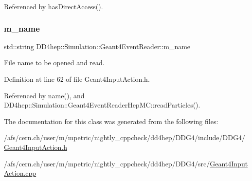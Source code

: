 Referenced by has\+Direct\+Access().

\hypertarget{class_d_d4hep_1_1_simulation_1_1_geant4_event_reader_a0a6ea787174ce598d22ce1616c1f25af}{}\label{class_d_d4hep_1_1_simulation_1_1_geant4_event_reader_a0a6ea787174ce598d22ce1616c1f25af} 
\subsubsection{\texorpdfstring{m\+\_\+name}{m\_name}}
{\footnotesize\ttfamily std\+::string D\+D4hep\+::\+Simulation\+::\+Geant4\+Event\+Reader\+::m\+\_\+name\hspace{0.3cm}{\ttfamily [protected]}}



File name to be opened and read. 



Definition at line 62 of file Geant4\+Input\+Action.\+h.



Referenced by name(), and D\+D4hep\+::\+Simulation\+::\+Geant4\+Event\+Reader\+Hep\+M\+C\+::read\+Particles().



The documentation for this class was generated from the following files\+:\begin{DoxyCompactItemize}
\item 
/afs/cern.\+ch/user/m/mpetric/nightly\+\_\+cppcheck/dd4hep/\+D\+D\+G4/include/\+D\+D\+G4/\hyperlink{_geant4_input_action_8h}{Geant4\+Input\+Action.\+h}\item 
/afs/cern.\+ch/user/m/mpetric/nightly\+\_\+cppcheck/dd4hep/\+D\+D\+G4/src/\hyperlink{_geant4_input_action_8cpp}{Geant4\+Input\+Action.\+cpp}\end{DoxyCompactItemize}
